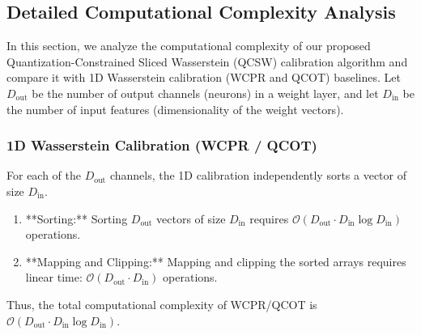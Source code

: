 \documentclass{article}
\theoremstyle{plain}
\theoremstyle{definition}
\theoremstyle{remark}
\begin{document}
\subsection{Detailed Computational Complexity Analysis}
In this section, we analyze the computational complexity of our proposed Quantization-Constrained Sliced Wasserstein (QCSW) calibration algorithm and compare it with 1D Wasserstein calibration (WCPR and QCOT) baselines. Let $D_{\text{out}}$ be the number of output channels (neurons) in a weight layer, and let $D_{\text{in}}$ be the number of input features (dimensionality of the weight vectors).

\subsubsection{1D Wasserstein Calibration (WCPR / QCOT)}
For each of the $D_{\text{out}}$ channels, the 1D calibration independently sorts a vector of size $D_{\text{in}}$.
\begin{enumerate}
    \item **Sorting:** Sorting $D_{\text{out}}$ vectors of size $D_{\text{in}}$ requires $\mathcal{O}(D_{\text{out}} \cdot D_{\text{in}} \log D_{\text{in}})$ operations.
    \item **Mapping and Clipping:** Mapping and clipping the sorted arrays requires linear time: $\mathcal{O}(D_{\text{out}} \cdot D_{\text{in}})$ operations.
\end{enumerate}
Thus, the total computational complexity of WCPR/QCOT is $\mathcal{O}(D_{\text{out}} \cdot D_{\text{in}} \log D_{\text{in}})$.
\end{document}
